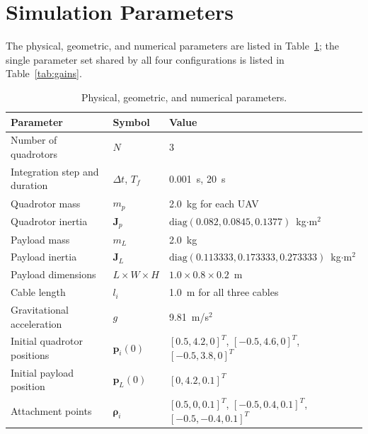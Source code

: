 \documentclass[Review,sageh,times]{sagej}
\begin{document}
\section*{Simulation Parameters}

The physical, geometric, and numerical parameters are listed in
Table~\ref{tab:physical}; the single parameter set shared by all four configurations
is listed in Table~\ref{tab:gains}.

\begin{table}[t]
\centering
\caption{Physical, geometric, and numerical parameters.}
\label{tab:physical}
\scriptsize
\begin{tabular}{@{}p{}p{}p{}@{}}
\hline
Parameter & Symbol & Value\\
\hline
Number of quadrotors & $N$ & 3\\
Integration step and duration & $\Delta t$, $T_f$ & 0.001~s, 20~s\\
Quadrotor mass & $m_p$ & 2.0~kg for each UAV\\
Quadrotor inertia & $\mathbf{J}_p$ & $\mathrm{diag}(0.082,0.0845,0.1377)$~kg$\cdot$m$^2$\\
Payload mass & $m_L$ & 2.0~kg\\
Payload inertia & $\mathbf{J}_L$ & $\mathrm{diag}(0.113333,0.173333,0.273333)$~kg$\cdot$m$^2$\\
Payload dimensions & $L\times W\times H$ & $1.0\times0.8\times0.2$~m\\
Cable length & $l_i$ & 1.0~m for all three cables\\
Gravitational acceleration & $g$ & 9.81~m/s$^2$\\
Initial quadrotor positions & $\mathbf{p}_i(0)$ &
$[0.5,4.2,0]^{T}$, $[-0.5,4.6,0]^{T}$, $[-0.5,3.8,0]^{T}$\\
Initial payload position & $\mathbf{p}_L(0)$ & $[0,4.2,0.1]^{T}$\\
Attachment points & $\boldsymbol{\rho}_i$ &
$[0.5,0,0.1]^{T}$, $[-0.5,0.4,0.1]^{T}$, $[-0.5,-0.4,0.1]^{T}$\\
\hline
\end{tabular}
\end{table}
\end{document}
